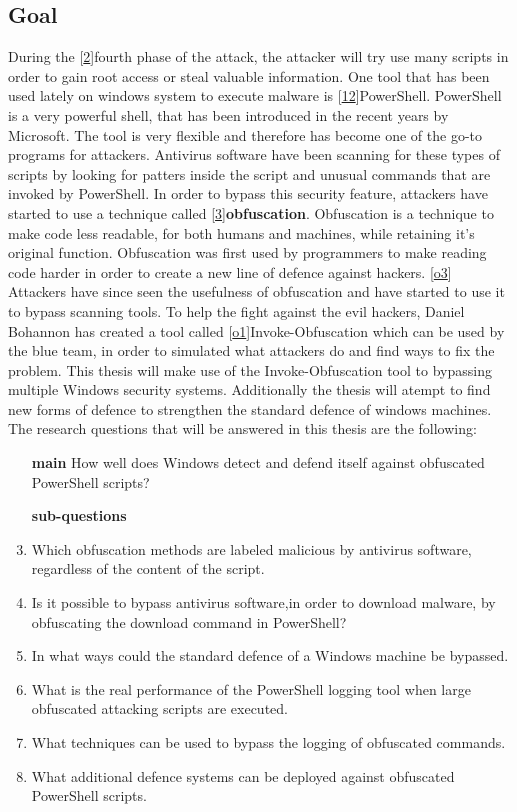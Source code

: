\documentclass{article}%
\begin{document}
\subsection{Goal}
During the [\hyperlink{2}{2}]fourth phase of the attack, the attacker will try use many scripts in order to gain root access or steal valuable information. One tool that has been used lately on windows system to execute malware is [\hyperlink{12}{12}]PowerShell. PowerShell is a very powerful shell, that has been introduced in the recent years by Microsoft. The tool is very flexible and therefore has become one of the go-to programs for attackers. Antivirus software have been scanning for these types of scripts by looking for patters inside the script and unusual commands that are invoked by PowerShell. In order to bypass this security feature, attackers have started to use a technique called [\hyperlink{3}{3}]\textbf{obfuscation}. Obfuscation is a technique to make code less readable, for both humans and machines, while retaining it's original function. Obfuscation was first used by programmers to make reading code harder in order to create a new line of defence against hackers. [\hyperlink{o3}{o3}] Attackers have since seen the usefulness of obfuscation and have started to use it to bypass scanning tools. To help the fight against the evil hackers, Daniel Bohannon has created a tool called [\hyperlink{o1}{o1}]Invoke-Obfuscation which can be used by the blue team, in order to simulated what attackers do and find ways to fix the problem. This thesis will make use of the Invoke-Obfuscation tool to bypassing multiple Windows security systems. Additionally the thesis will atempt to find new forms of defence to strengthen the standard defence of windows machines.  The research questions that will be answered in this thesis are the following:
\begin{enumerate}
	\item[\textbf{main}]How well does Windows detect and defend itself against obfuscated PowerShell scripts?
	\item[\textbf{sub-questions}]
	\item Which obfuscation methods are labeled malicious by antivirus software, regardless of the content of the script.
	\item Is it possible to bypass antivirus software,in order to download malware, by obfuscating the download command in PowerShell?
	\item In what ways could the standard defence of a Windows machine be bypassed.
	\item What is the real performance of the PowerShell logging tool when large obfuscated attacking scripts are executed.
	\item What techniques can be used to bypass the logging of obfuscated commands.
	\item What additional defence systems can be deployed against obfuscated PowerShell scripts.
\end{enumerate}
\end{document}
